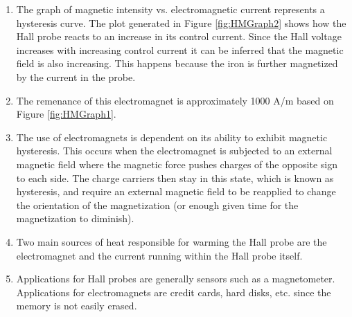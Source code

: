 \begin{enumerate}[resume]
\item The graph of magnetic intensity vs. electromagnetic current represents a hysteresis curve. The plot generated in Figure \ref{fig:HMGraph2} shows how the Hall probe reacts to an increase in its control current. Since the Hall voltage increases with increasing control current it can be inferred that the magnetic field is also increasing. This happens because the iron is further magnetized by the current in the probe.
\item The remenance of this electromagnet is approximately 1000 A/m based on Figure \ref{fig:HMGraph1}.
\item The use of electromagnets is dependent on its ability to exhibit magnetic hysteresis. This occurs when the electromagnet is subjected to an external magnetic field where the magnetic force pushes charges of the opposite sign to each side. The charge carriers then stay in this state, which is known as hysteresis, and require an external magnetic field to be reapplied to change the orientation of the magnetization (or enough given time for the magnetization to diminish).
\item Two main sources of heat responsible for warming the Hall probe are the electromagnet and the current running within the Hall probe itself.
\item Applications for Hall probes are generally sensors such as a magnetometer. Applications for electromagnets are credit cards, hard disks, etc. since the memory is not easily erased.
\end{enumerate}

\AtEndDocument{\clearpage\ifodd\value{page}\else\null\clearpage\fi} %


